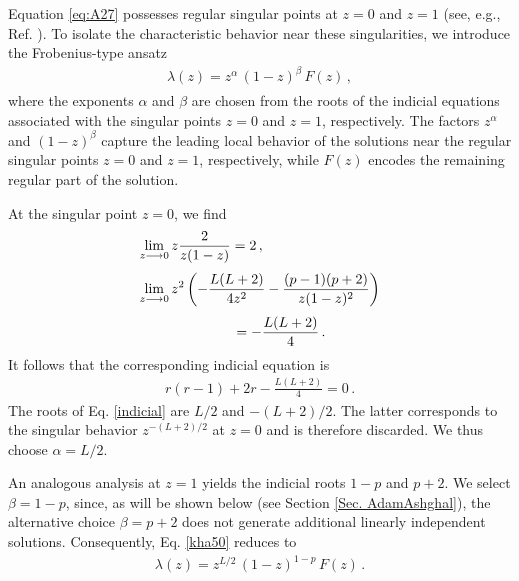 \documentclass[aps,twocolumn,nofootinbib]{revtex4}
\begin{document}
{\begin{appendix}
Equation \eqref{eq:A27} possesses regular singular points at $z=0$ and $z=1$ (see, e.g., Ref. \cite[Secs. 5.4-5.7]{Boyce-2021}). To isolate the characteristic behavior near these singularities, we introduce the Frobenius-type ansatz
\begin{align}\label{kha50}
    \lambda(z)=z_{}^\alpha\, (1-z)_{}^\beta\, F(z)\,,
\end{align}
where the exponents $\alpha$ and $\beta$ are chosen from the roots of the indicial equations associated with the singular points $z=0$ and $z=1$, respectively. The factors $z^\alpha$ and $(1-z)^\beta$ capture the leading local behavior of the solutions near the regular singular points $z=0$ and $z=1$, respectively, while $F(z)$ encodes the remaining regular part of the solution.

At the singular point $z=0$, we find
\begin{align}
    \lim_{z\longrightarrow 0}&\,z\frac{2}{z(1-z)}=2\,,\\[3pt]
    \lim_{z\longrightarrow 0}&\,z_{}^2 \left(-\frac{L(L+2)}{4z_{}^2} - \frac{(p-1)(p+2)}{z(1-z)_{}^2}\right) \nonumber\\[3pt]
    &\hspace{1.6cm} = -\frac{L(L+2)}{4}\,.
\end{align}
It follows that the corresponding indicial equation is
\begin{align}\label{indicial}
    r(r-1) + 2 r - \frac{L(L+2)}{4} = 0\,. 
\end{align}
The roots of Eq. \eqref{indicial} are $L/2$ and $-(L+2)/2$. The latter corresponds to the singular behavior $z^{-(L+2)/2}$ at $z=0$ and is therefore discarded. We thus choose $\alpha=L/2$. 

An analogous analysis at $z=1$ yields the indicial roots $1-p$ and $p+2$. We select $\beta=1-p$, since, as will be shown below (see Section \ref{Sec. AdamAshghal}), the alternative choice $\beta=p+2$ does not generate additional linearly independent solutions. Consequently, Eq. \eqref{kha50} reduces to
\begin{align}\label{ka60}
    \lambda(z)=z_{}^{L/2}\, (1-z)_{}^{1-p}\, F(z)\,.  
\end{align}


\end{appendix}}
\end{document}
